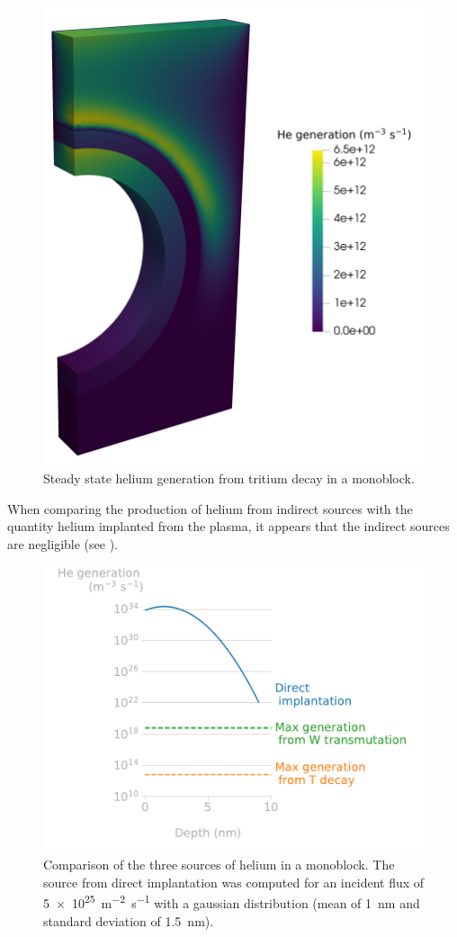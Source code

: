 \begin{figure}
    \centering
    \includegraphics[width=0.5\linewidth]{Figures/Chapter5/he_generation_decay.png}
    \caption{Steady state helium generation from tritium decay in a monoblock.}
\end{figure}


When comparing the production of helium from indirect sources with the quantity helium implanted from the plasma, it appears that the indirect sources are negligible (see ).

\begin{figure}
    \centering
    \includegraphics[width=\linewidth]{Figures/Chapter5/helium_generation.pdf}
    \caption{Comparison of the three sources of helium in a \gls{monoblock}. The source from direct implantation was computed for an incident flux of \SI{5e25}{m^{-2}.s^{-1}} with a gaussian distribution (mean of \SI{1}{nm} and standard deviation of \SI{1.5}{nm}).}
\end{figure}